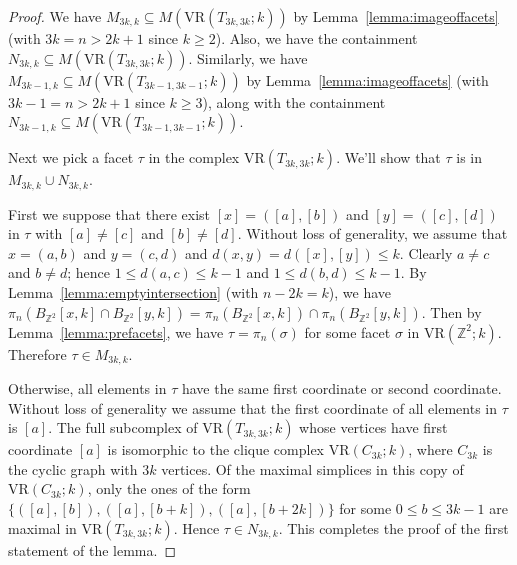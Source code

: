 \documentclass[10pt,a4paper]{amsart}
\newcommand{\Z}{\ensuremath{\mathbb{Z}}}
\newcommand{\vr}[2]{\mathrm{VR}(#1;#2)}
\begin{document}
\begin{proof}
We have $M_{3k,k}\subseteq M(\vr{T_{3k,3k}}{k})$ by Lemma~\ref{lemma:imageoffacets} (with $3k=n>2k+1$ since $k\ge 2$).
Also, we have the containment $N_{3k,k}\subseteq M(\vr{T_{3k,3k}}{k})$.
Similarly, we have $M_{3k-1,k}\subseteq M(\vr{T_{3k-1,3k-1}}{k})$ by Lemma~\ref{lemma:imageoffacets} (with $3k-1=n>2k+1$ since $k\ge 3$), along with the containment $N_{3k-1,k}\subseteq M(\vr{T_{3k-1,3k-1}}{k})$.

Next we pick a facet $\tau$ in the complex $\vr{T_{3k,3k}}{k}$.
We'll show that $\tau$ is in $M_{3k,k}\cup N_{3k,k}$.

First we suppose that there exist $[x] =([a], [b])$ and $[y]=([c], [d])$ in $\tau$ with $[a]\neq [c]$ and $[b]\neq [d]$.
Without loss of generality, we assume that $x=(a, b)$ and $y=(c, d)$ and $d(x, y)=d([x], [y])\le k$.
Clearly $a\neq c$ and $b\neq d$; hence $1\leq d(a, c)\leq k-1$ and $1\leq d(b, d)\leq k-1$.
By Lemma~\ref{lemma:emptyintersection} (with $n-2k=k$), we have $\pi_n (B_{\Z^2}[x, k]\cap B_{\Z^2}[y, k]) =\pi_n(B_{\Z^2}[x, k]) \cap \pi_n(B_{\Z^2}[y, k])$.
Then by Lemma~\ref{lemma:prefacets}, we have $\tau=\pi_n(\sigma)$ for some facet $\sigma$ in $\vr{\Z^2}{k}$.
Therefore $\tau\in M_{3k,k}$.


Otherwise, all elements in $\tau$ have the same first coordinate or second coordinate.
Without loss of generality we assume that the first coordinate of all elements in $\tau$ is $[a]$.
The full subcomplex of $\vr{T_{3k,3k}}{k}$ whose vertices have first coordinate $[a]$ is isomorphic to the clique complex $\vr{C_{3k}}{k}$, where $C_{3k}$ is the cyclic graph with $3k$ vertices.
Of the maximal simplices in this copy of $\vr{C_{3k}}{k}$, only the ones of the form $\{([a], [b]), ([a], [b+k]), ([a], [b+2k])\}$ for some $0\leq b\leq 3k-1$ are maximal in $\vr{T_{3k,3k}}{k}$.
Hence $\tau\in N_{3k,k}$.
This completes the proof of the first statement of the lemma. 

\medskip 


\end{proof}
\end{document}
